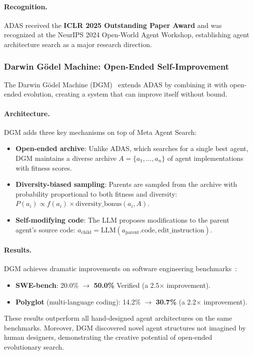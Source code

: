 \paragraph{Recognition.}
ADAS received the \textbf{ICLR 2025 Outstanding Paper Award} and was recognized at the NeurIPS 2024 Open-World Agent Workshop, establishing agent architecture search as a major research direction.

\subsubsection{Darwin G\"odel Machine: Open-Ended Self-Improvement}
\label{sec:dgm-detail}

The Darwin G\"odel Machine (DGM)~\citep{zhang2025dgm} extends ADAS by combining it with open-ended evolution, creating a system that can improve itself without bound.

\paragraph{Architecture.}
DGM adds three key mechanisms on top of Meta Agent Search:
\begin{itemize}
    \item \textbf{Open-ended archive}: Unlike ADAS, which searches for a single best agent, DGM maintains a diverse archive $A = \{a_1, \ldots, a_n\}$ of agent implementations with fitness scores.
    \item \textbf{Diversity-biased sampling}: Parents are sampled from the archive with probability proportional to both fitness and diversity: $P(a_i) \propto f(a_i) \times \text{diversity\_bonus}(a_i, A)$.
    \item \textbf{Self-modifying code}: The LLM proposes modifications to the parent agent's source code: $a_{\text{child}} = \text{LLM}(a_{\text{parent}}.\text{code}, \text{edit\_instruction})$.
\end{itemize}

\paragraph{Results.}
DGM achieves dramatic improvements on software engineering benchmarks~\citep{zhang2025dgm}:
\begin{itemize}
    \item \textbf{SWE-bench}: 20.0\% $\rightarrow$ \textbf{50.0\%} Verified (a 2.5$\times$ improvement).
    \item \textbf{Polyglot} (multi-language coding): 14.2\% $\rightarrow$ \textbf{30.7\%} (a 2.2$\times$ improvement).
\end{itemize}
These results outperform all hand-designed agent architectures on the same benchmarks. Moreover, DGM discovered novel agent structures not imagined by human designers, demonstrating the creative potential of open-ended evolutionary search.

